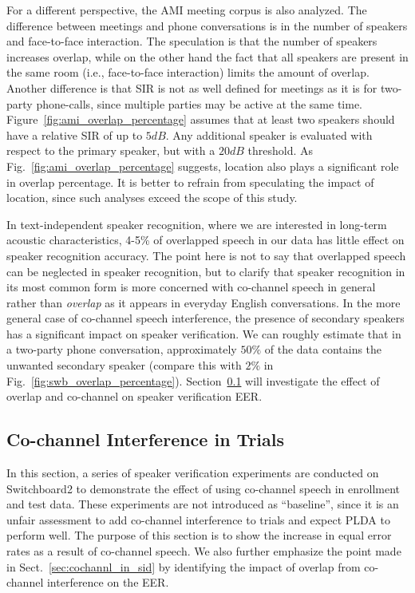 For a different perspective, the AMI meeting corpus is also analyzed. 
The difference between meetings and phone conversations is in the number of speakers and face-to-face interaction. 
The speculation is that the number of speakers increases overlap, while on the other hand the fact that all speakers are present in the same room (i.e., face-to-face interaction) limits the amount of overlap. 
Another difference is that SIR is not as well defined for meetings as it is for two-party phone-calls, since multiple parties may be active at the same time. 
Figure~\ref{fig:ami_overlap_percentage} assumes that at least two speakers should have a relative SIR of up to $5dB$. 
Any additional speaker is evaluated with respect to the primary speaker, but with a $20dB$ threshold. 
As Fig.~\ref{fig:ami_overlap_percentage} suggests, location also plays a significant role in overlap percentage. 
It is better to refrain from speculating the impact of location, since such analyses exceed the scope of this study. 

In text-independent speaker recognition, where we are interested in long-term acoustic characteristics, 4-5\% of overlapped speech in our data has little effect on speaker recognition accuracy. 
The point here is not to say that overlapped speech can be neglected in speaker recognition, but to clarify that speaker recognition in its most common form is more concerned with co-channel speech in general rather than {\it overlap} as it appears in everyday English conversations. 
In the more general case of co-channel speech interference, the presence of secondary speakers has a significant impact on speaker verification. 
We can roughly estimate that in a two-party phone conversation, approximately $50\%$ of the data contains the unwanted secondary speaker (compare this with $2\%$ in Fig.~\ref{fig:swb_overlap_percentage}). 
Section~\ref{ssec:cch_in_trials} will investigate the effect of overlap and co-channel on speaker verification EER. 



\subsection{Co-channel Interference in Trials}
\label{ssec:cch_in_trials}
In this section, a series of speaker verification experiments are conducted on Switchboard2 to demonstrate the effect of using co-channel speech in enrollment and test data. 
These experiments are not introduced as ``baseline'', since it is an unfair assessment to add co-channel interference to trials and expect PLDA to perform well. 
The purpose of this section is to show the increase in equal error rates as a result of co-channel speech. 
We also further emphasize the point made in Sect.~\ref{sec:cochannl_in_sid} by identifying the impact of overlap from co-channel interference on the EER. 

